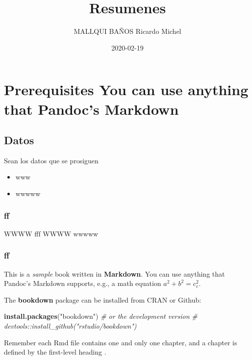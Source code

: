 \documentclass[12pt,]{report}
\title{Resumenes}
\author{MALLQUI BAÑOS Ricardo Michel}
\date{2020-02-19}
\newenvironment{Shaded}{\begin{snugshade}}{\end{snugshade}}
\newcommand{\CommentTok}[1]{\textcolor[rgb]{0.56,0.35,0.01}{\textit{#1}}}
\newcommand{\KeywordTok}[1]{\textcolor[rgb]{0.13,0.29,0.53}{\textbf{#1}}}
\newcommand{\NormalTok}[1]{#1}
\newcommand{\StringTok}[1]{\textcolor[rgb]{0.31,0.60,0.02}{#1}}
\providecommand{\tightlist}{%
  \setlength{\itemsep}{0pt}\setlength{\parskip}{0pt}}
\begin{document}
\maketitle

{
\setcounter{tocdepth}{1}
\tableofcontents
}
\hypertarget{prerequisites-you-can-use-anything-that-pandocs-markdown}{%
\chapter{Prerequisites You can use anything that Pandoc's Markdown}\label{prerequisites-you-can-use-anything-that-pandocs-markdown}}

\hypertarget{datos}{%
\section{Datos}\label{datos}}

Sean los datos que se prosiguen

\begin{itemize}
\tightlist
\item
  www
\item
  wwwww
\end{itemize}

\hypertarget{ff}{%
\subsection{ff}\label{ff}}

WWWW fff
WWWW wwwww

\hypertarget{ff-1}{%
\subsection{ff}\label{ff-1}}

This is a \emph{sample} book written in \textbf{Markdown}. You can use anything that Pandoc's Markdown supports, e.g., a math equation \(a^2 + b^2 = c^2_c\).

The \textbf{bookdown} package can be installed from CRAN or Github:

\begin{Shaded}
\begin{Highlighting}[]
\KeywordTok{install.packages}\NormalTok{(}\StringTok{"bookdown"}\NormalTok{)}
\CommentTok{# or the development version}
\CommentTok{# devtools::install_github("rstudio/bookdown")}
\end{Highlighting}
\end{Shaded}

Remember each Rmd file contains one and only one chapter, and a chapter is defined by the first-level heading .
\end{document}
